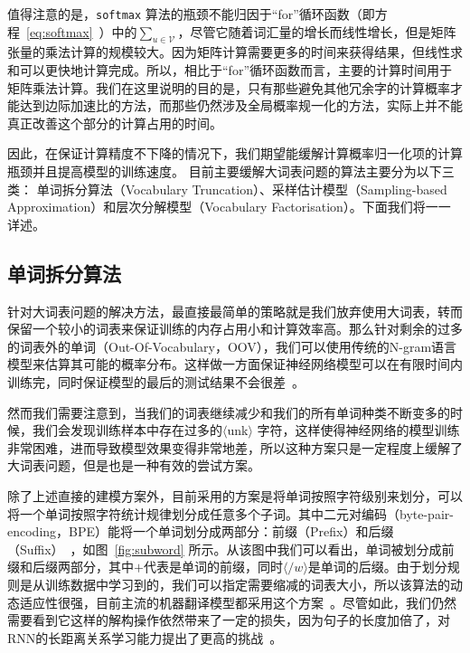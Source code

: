 值得注意的是，\texttt{softmax} 算法的瓶颈不能归因于``for''循环函数（即方程~\ref{eq:softmax}~）中的$ \sum_ {u \in \mathcal {V}} $，尽管它随着词汇量的增长而线性增长，但是矩阵张量的乘法计算的规模较大。因为矩阵计算需要更多的时间来获得结果，但线性求和可以更快地计算完成。所以，相比于``for''循环函数而言，主要的计算时间用于矩阵乘法计算。我们在这里说明的目的是，只有那些避免其他冗余字的计算概率才能达到边际加速比的方法，而那些仍然涉及全局概率规一化的方法，实际上并不能真正改善这个部分的计算占用的时间。


因此，在保证计算精度不下降的情况下，我们期望能缓解计算概率归一化项的计算瓶颈并且提高模型的训练速度。 目前主要缓解大词表问题的算法主要分为以下三类： 单词拆分算法（Vocabulary Truncation）、采样估计模型（Sampling-based Approximation）和层次分解模型（Vocabulary Factorisation）。下面我们将一一详述。


\subsection{单词拆分算法}
针对大词表问题的解决方法，最直接最简单的策略就是我们放弃使用大词表，转而保留一个较小的词表来保证训练的内存占用小和计算效率高。那么针对剩余的过多的词表外的单词（Out-Of-Vocabulary，OOV），我们可以使用传统的N-gram语言模型来估算其可能的概率分布。这样做一方面保证神经网络模型可以在有限时间内训练完，同时保证模型的最后的测试结果不会很差~。

然而我们需要注意到，当我们的词表继续减少和我们的所有单词种类不断变多的时候，我们会发现训练样本中存在过多的$\langle$unk$\rangle$ 字符，这样使得神经网络的模型训练非常困难，进而导致模型效果变得非常地差，所以这种方案只是一定程度上缓解了大词表问题，但是也是一种有效的尝试方案。

除了上述直接的建模方案外，目前采用的方案是将单词按照字符级别来划分，可以将一个单词按照字符统计规律划分成任意多个子词。其中二元对编码（byte-pair-encoding，BPE）能将一个单词划分成两部分：前缀（Prefix）和后缀（Suffix）~，如图~\ref{fig:subword} 所示。从该图中我们可以看出，单词被划分成前缀和后缀两部分，其中$+$代表是单词的前缀，同时$\langle /w \rangle$是单词的后缀。由于划分规则是从训练数据中学习到的，我们可以指定需要缩减的词表大小，所以该算法的动态适应性很强，目前主流的机器翻译模型都采用这个方案~。尽管如此，我们仍然需要看到它这样的解构操作依然带来了一定的损失，因为句子的长度加倍了，对RNN的长距离关系学习能力提出了更高的挑战~。

